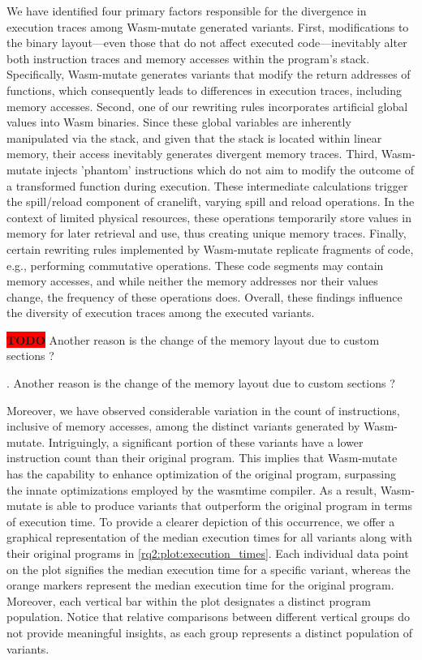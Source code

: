 \documentclass[sigplan,screen]{acmart}
\newcommand*\badge[1]{ \colorbox{red}{\color{white}#1}}
\newcommand{\tool}{Wasm-mutate\xspace}
\newcommand{\wasm}{Wasm\xspace}
\newcommand{\todo}[1]{%
\refstepcounter{todo}
\noindent\textbf{\badge{TODO}} {\color{red}#1}
\addcontentsline{td}{todo}
{\color{red}\thesection.\thetodo\xspace #1}}
\begin{document}
We have identified four primary factors responsible for the divergence in execution traces among \tool generated variants.
First, modifications to the binary layout—even those that do not affect executed code—inevitably alter both instruction traces and memory accesses within the program's stack. 
Specifically, \tool generates variants that modify the return addresses of functions, which consequently leads to differences in execution traces, including memory accesses.
Second, one of our rewriting rules incorporates artificial global values into \wasm binaries. 
Since these global variables are inherently manipulated via the stack, and given that the stack is located within linear memory, their access inevitably generates divergent memory traces.
Third, \tool injects 'phantom' instructions which do not aim to modify the outcome of a transformed function during execution. 
These intermediate calculations trigger the spill/reload component of cranelift, varying spill and reload operations. 
In the context of limited physical resources, these operations temporarily store values in memory for later retrieval and use, thus creating unique memory traces.
Finally, certain rewriting rules implemented by \tool replicate fragments of code, e.g., performing commutative operations. 
These code segments may contain memory accesses, and while neither the memory addresses nor their values change, the frequency of these operations does.
Overall, these findings influence the diversity of execution traces among the executed variants. 

\todo{Another reason is the change of the memory layout due to custom sections ?}





Moreover, we have observed considerable variation in the count of instructions, inclusive of memory accesses, among the distinct variants generated by \tool.
Intriguingly, a significant portion of these variants have a lower instruction count than their original program. 
This implies that \tool has the capability to enhance optimization of the original program, surpassing the innate optimizations employed by the wasmtime compiler. 
As a result, \tool is able to produce variants that outperform the original program in terms of execution time.
To provide a clearer depiction of this occurrence, we offer a graphical representation of the median execution times for all variants along with their original programs in \autoref{rq2:plot:execution_times}. 
Each individual data point on the plot signifies the median execution time for a specific variant, whereas the orange markers represent the median execution time for the original program.
Moreover, each vertical bar within the plot designates a distinct program population. 
Notice that relative comparisons between different vertical groups do not provide meaningful insights, as each group represents a distinct population of variants.
\end{document}
